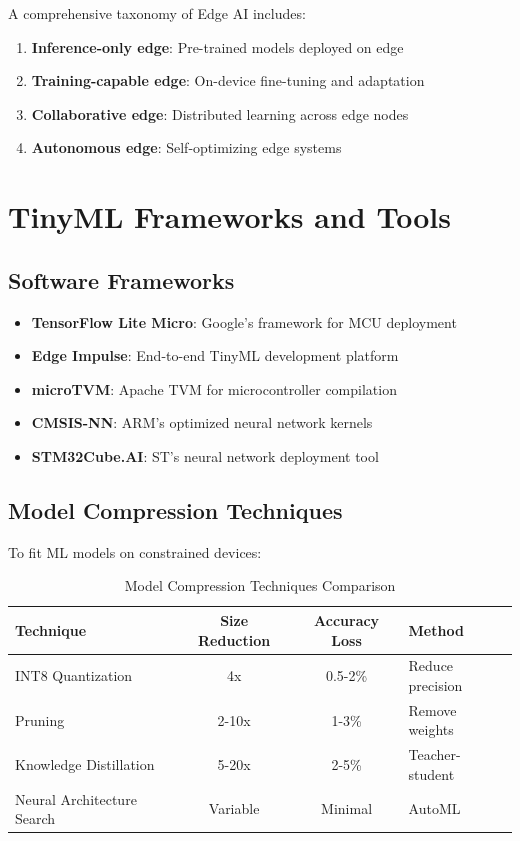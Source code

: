 \documentclass[12pt,a4paper]{article}
\begin{document}
A comprehensive taxonomy of Edge AI includes:
\begin{enumerate}
    \item \textbf{Inference-only edge}: Pre-trained models deployed on edge
    \item \textbf{Training-capable edge}: On-device fine-tuning and adaptation
    \item \textbf{Collaborative edge}: Distributed learning across edge nodes
    \item \textbf{Autonomous edge}: Self-optimizing edge systems
\end{enumerate}

\section{TinyML Frameworks and Tools}

\subsection{Software Frameworks}

\begin{tcolorbox}[colback=mlgreen!10, colframe=mlgreen, title=Major TinyML Frameworks]
\begin{itemize}
    \item \textbf{TensorFlow Lite Micro}: Google's framework for MCU deployment
    \item \textbf{Edge Impulse}: End-to-end TinyML development platform
    \item \textbf{microTVM}: Apache TVM for microcontroller compilation
    \item \textbf{CMSIS-NN}: ARM's optimized neural network kernels
    \item \textbf{STM32Cube.AI}: ST's neural network deployment tool
\end{itemize}
\end{tcolorbox}

\subsection{Model Compression Techniques}

To fit ML models on constrained devices:

\begin{table}[H]
\centering
\caption{Model Compression Techniques Comparison}
\begin{tabular}{lccl}
\toprule
\textbf{Technique} & \textbf{Size Reduction} & \textbf{Accuracy Loss} & \textbf{Method} \\
\midrule
INT8 Quantization & 4x & 0.5-2\% & Reduce precision \\
Pruning & 2-10x & 1-3\% & Remove weights \\
Knowledge Distillation & 5-20x & 2-5\% & Teacher-student \\
Neural Architecture Search & Variable & Minimal & AutoML \\
\bottomrule
\end{tabular}
\end{table}
\end{document}
